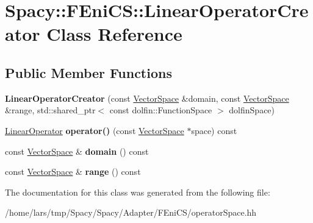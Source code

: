 \hypertarget{classSpacy_1_1FEniCS_1_1LinearOperatorCreator}{}\section{Spacy\+:\+:F\+Eni\+CS\+:\+:Linear\+Operator\+Creator Class Reference}
\label{classSpacy_1_1FEniCS_1_1LinearOperatorCreator}
\subsection*{Public Member Functions}
\begin{DoxyCompactItemize}
\item 
{\bfseries Linear\+Operator\+Creator} (const \hyperlink{classSpacy_1_1VectorSpace}{Vector\+Space} \&domain, const \hyperlink{classSpacy_1_1VectorSpace}{Vector\+Space} \&range, std\+::shared\+\_\+ptr$<$ const dolfin\+::\+Function\+Space $>$ dolfin\+Space)\hypertarget{classSpacy_1_1FEniCS_1_1LinearOperatorCreator_ac95b6324d13993c0a8e2393a4521e14b}{}\label{classSpacy_1_1FEniCS_1_1LinearOperatorCreator_ac95b6324d13993c0a8e2393a4521e14b}

\item 
\hyperlink{classSpacy_1_1FEniCS_1_1LinearOperator}{Linear\+Operator} {\bfseries operator()} (const \hyperlink{classSpacy_1_1VectorSpace}{Vector\+Space} $\ast$space) const \hypertarget{classSpacy_1_1FEniCS_1_1LinearOperatorCreator_a2ef756542e2bab847054dc90726d1f50}{}\label{classSpacy_1_1FEniCS_1_1LinearOperatorCreator_a2ef756542e2bab847054dc90726d1f50}

\item 
const \hyperlink{classSpacy_1_1VectorSpace}{Vector\+Space} \& {\bfseries domain} () const \hypertarget{classSpacy_1_1FEniCS_1_1LinearOperatorCreator_a0eab2a20a95036e44e44dee2c64b3b26}{}\label{classSpacy_1_1FEniCS_1_1LinearOperatorCreator_a0eab2a20a95036e44e44dee2c64b3b26}

\item 
const \hyperlink{classSpacy_1_1VectorSpace}{Vector\+Space} \& {\bfseries range} () const \hypertarget{classSpacy_1_1FEniCS_1_1LinearOperatorCreator_a9a26a81885dfe279565f48cee5fb43ed}{}\label{classSpacy_1_1FEniCS_1_1LinearOperatorCreator_a9a26a81885dfe279565f48cee5fb43ed}

\end{DoxyCompactItemize}


The documentation for this class was generated from the following file\+:\begin{DoxyCompactItemize}
\item 
/home/lars/tmp/\+Spacy/\+Spacy/\+Adapter/\+F\+Eni\+C\+S/operator\+Space.\+hh\end{DoxyCompactItemize}
